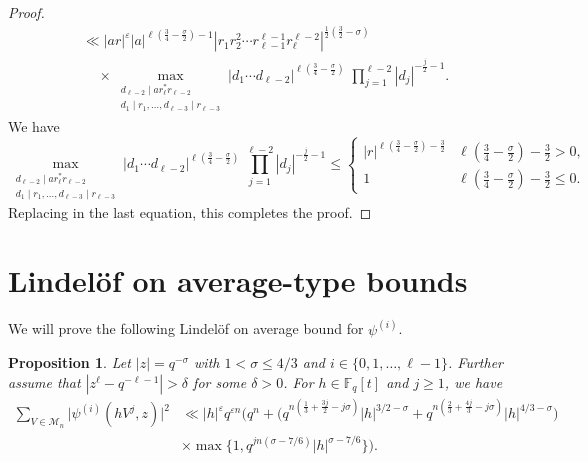 \documentclass[12pt]{amsart}
\newtheorem{proposition}[theorem]{Proposition}
\begin{document}
\begin{proof}
\begin{align*}
 &\ll  |ar|^\varepsilon |a|^{\ell \left( \frac34 - \frac{\sigma}{2} \right) -1 } \left|r_1 r_2^2 \cdots r_{\ell-1}^{\ell-1} r_\ell^{\ell-2}\right|^{\frac12 (\frac32 - \sigma)} \\
 & \;\;\;\; \times  \max_{\substack{d_{\ell-2} \mid a r_\ell^* r_{\ell-2}\\ d_1\mid r_1, \dots, d_{\ell-3}\mid r_{\ell-3}}}
|d_1 \cdots d_{\ell-2}|^{\ell \left( \frac34 - \frac{\sigma}{2} \right) }  \; {\prod_{j=1}^{\ell-2} |d_j|^{-\frac{j}{2}-1}} .
\end{align*}
We have
$$
\max_{\substack{d_{\ell-2} \mid a r_\ell^* r_{\ell-2}\\ d_1\mid r_1, \dots, d_{\ell-3}\mid r_{\ell-3}}}
|d_1 \cdots d_{\ell-2}|^{\ell \left( \frac34 - \frac{\sigma}{2} \right) }  \; {\prod_{j=1}^{\ell-2} |d_j|^{-\frac{j}{2}-1}}  \leq \begin{cases} |r|^{\ell \left( \frac34 - \frac{\sigma}{2} \right) - \frac32} & \ell \left( \tfrac34 - \tfrac{\sigma}{2} \right) - \tfrac32 > 0, \\ 1 & \ell \left( \tfrac34 - \tfrac{\sigma}{2} \right) - \tfrac32 \leq 0. \end{cases}
$$
Replacing in the last equation, this completes the proof.
\end{proof}

\section{Lindel\"{o}f on average-type bounds}
\label{section_lov}

We will prove the following Lindel\"{o}f on average bound for $\psi^{(i)}$.


\begin{proposition}
\label{lov}
Let $|z|=q^{-\sigma}$ with $1 < \sigma \leq 4/3$ and $i \in \{0,1,\ldots, \ell-1\}$. Further assume that  $|z^{\ell}-q^{-\ell-1}| > \delta$ for some $\delta>0$. For $h \in \mathbb{F}_q[t]$ and $j \geq 1$, we have
\begin{align*}
  \sum_{V \in \mathcal{M}_n} \Big| \psi^{(i)} (hV^j, z ) \Big|^2 & \ll |h|^{\varepsilon} q^{\varepsilon n} \Bigg( q^n + \Big(q^{n(\frac{1}{3}+\frac{3j}{2}-j\sigma)} |h|^{3/2-\sigma} +  q^{n(\frac{2}{3}+\frac{4j}{3}-j\sigma)} |h|^{4/3-\sigma}\Big) \\
  & \times \max \Big\{1, q^{jn(\sigma-7/6)} |h|^{\sigma-7/6} \Big\}\Bigg) .
  \end{align*}
\end{proposition}
\end{document}
